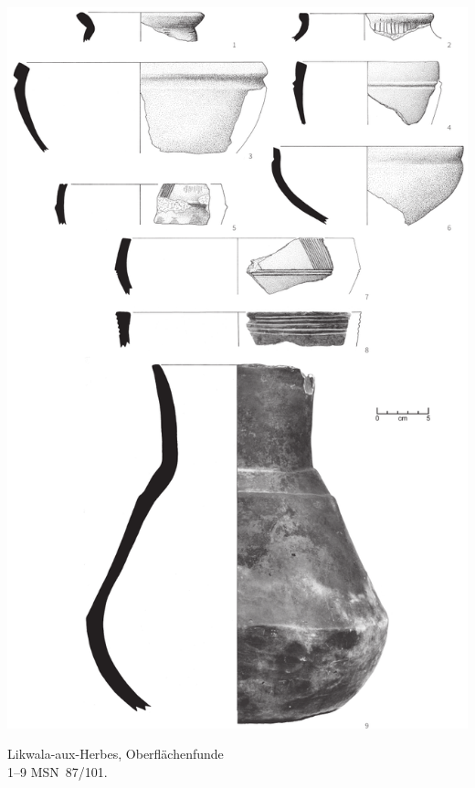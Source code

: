 \begin{pl}[H]
	\includegraphics{plt/Taf80.pdf}
	\vspace{.75em}\caption{Likwala-aux-Herbes, Oberflächenfunde \\ 1--9 MSN~87/101.}
	\label{pl:80}
\end{pl}

